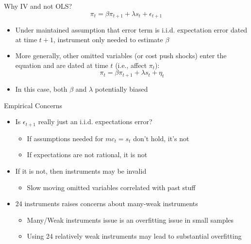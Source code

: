 \documentclass[10pt]{beamer}
\begin{document}
\begin{frame}{Why IV and not OLS?}
\[ \pi_{t} = \beta \pi_{t+1} + \lambda s_{t} + \epsilon_{t+1} \] \vspace{-15pt}
\begin{itemize}
\item Under maintained assumption that error term is i.i.d. expectation error dated at time $t+1$, instrument only needed to estimate $\beta$
\item More generally, other omitted variables (or cost push shocks) enter the equation and are dated at time $t$ (i.e., affect $\pi_{t}$):
\[ \pi_{t} = \beta \pi_{t+1} + \lambda s_{t} + \eta_{t} \]
\item In this case, both $\beta$ and $\lambda$ potentially biased
\end{itemize}
\end{frame}

\begin{frame}{Empirical Concerns}
\begin{itemize}
\itemsep1em 
\item Is $\epsilon_{t+1}$ really just an i.i.d. expectations error?
\begin{itemize}
\item If assumptions needed for $mc_{t} = s_{t}$ don't hold, it's not
\item If expectations are not rational, it is not
\end{itemize}
\item If it is not, then instruments may be invalid
\begin{itemize}
\item Slow moving omitted variables correlated with past stuff
\end{itemize}
\item 24 instruments raises concerns about many-weak instruments
\begin{itemize}
\item Many/Weak instruments issue is an overfitting issue in small samples
\item Using 24 relatively weak instruments may lead to substantial overfitting
\end{itemize}
\end{itemize}
\end{frame}
\end{document}
